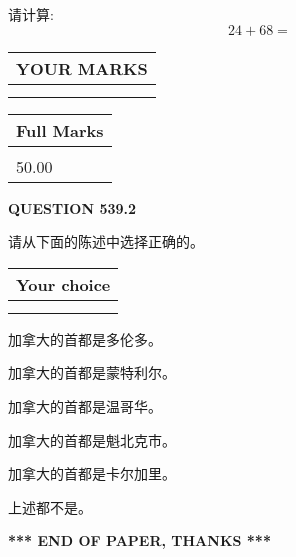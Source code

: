 \documentclass{ctexart}
\begin{document}
  
 
请计算:
\begin{equation}
24 +  %
68 = \nonumber
\end{equation}
 

 

 
  
\vspace{0.2in}
  
\noindent\begin{tabular}{|l|}
\hline
 YOUR MARKS  \\
\hline
 \\ 
 \\ 
\hline
\end{tabular}
\hspace{0.05in} \begin{tabular}{|l|}
\hline
 Full Marks  \\
\hline
 \\ 
50.00 \\
\hline
\end{tabular}
{\textbf{\Large{QUESTION
539.2 
}}}
  
  
请从下面的陈述中选择正确的。
  
  
\noindent\hspace{3.0in} \begin{tabular}{|l|}
\hline
Your choice \\
\hline
 \\ 
 \\ 
\hline
\end{tabular}
  
  
 
 
加拿大的首都是多伦多。
 
 
加拿大的首都是蒙特利尔。
 
 
加拿大的首都是温哥华。
 
 
加拿大的首都是魁北克市。
 
 
加拿大的首都是卡尔加里。
 
 
 上述都不是。
 
 
   
   
 \vspace{0.2in}
 
   
   
   
   
\vspace{1.0in} 
{\textbf{\large{ *** END OF PAPER, THANKS *** }}} 
   
\end{document}
